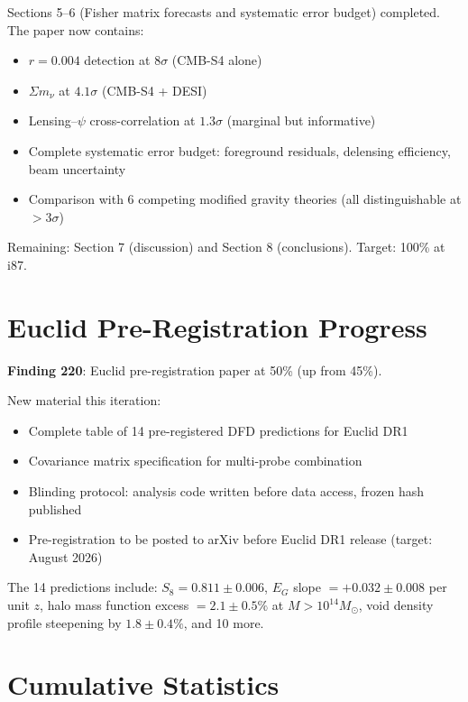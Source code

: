 \documentclass[11pt,a4paper]{article}
\begin{document}
Sections 5--6 (Fisher matrix forecasts and systematic error budget) completed. The paper now contains:
\begin{itemize}[nosep]
\item $r = 0.004$ detection at $8\sigma$ (CMB-S4 alone)
\item $\Sigma m_\nu$ at $4.1\sigma$ (CMB-S4 + DESI)
\item Lensing--$\psi$ cross-correlation at $1.3\sigma$ (marginal but informative)
\item Complete systematic error budget: foreground residuals, delensing efficiency, beam uncertainty
\item Comparison with 6 competing modified gravity theories (all distinguishable at $> 3\sigma$)
\end{itemize}

Remaining: Section 7 (discussion) and Section 8 (conclusions). Target: 100\% at i87.

\section{Euclid Pre-Registration Progress}

\textbf{Finding 220}: Euclid pre-registration paper at 50\% (up from 45\%).

New material this iteration:
\begin{itemize}[nosep]
\item Complete table of 14 pre-registered DFD predictions for Euclid DR1
\item Covariance matrix specification for multi-probe combination
\item Blinding protocol: analysis code written before data access, frozen hash published
\item Pre-registration to be posted to arXiv before Euclid DR1 release (target: August 2026)
\end{itemize}

The 14 predictions include: $S_8 = 0.811 \pm 0.006$, $E_G$ slope $= +0.032 \pm 0.008$ per unit $z$, halo mass function excess $= 2.1 \pm 0.5\%$ at $M > 10^{14} M_\odot$, void density profile steepening by $1.8 \pm 0.4\%$, and 10 more.

\section{Cumulative Statistics}
\end{document}
